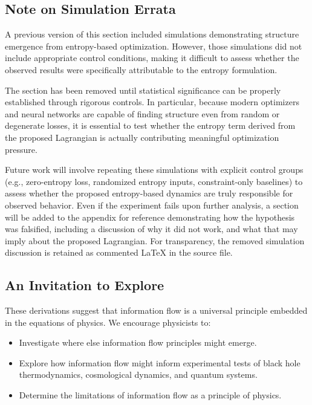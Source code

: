 \documentclass[12pt]{article}
\begin{document}
\subsection{Note on Simulation Errata}

A previous version of this section included simulations demonstrating structure emergence from entropy-based optimization. However, those simulations did not include appropriate control conditions, making it difficult to assess whether the observed results were specifically attributable to the entropy formulation.

The section has been removed until statistical significance can be properly established through rigorous controls. In particular, because modern optimizers and neural networks are capable of finding structure even from random or degenerate losses, it is essential to test whether the entropy term derived from the proposed Lagrangian is actually contributing meaningful optimization pressure.

Future work will involve repeating these simulations with explicit control groups (e.g., zero-entropy loss, randomized entropy inputs, constraint-only baselines) to assess whether the proposed entropy-based dynamics are truly responsible for observed behavior. Even if the experiment fails upon further analysis, a section will be added to the appendix for reference demonstrating how the hypothesis was falsified, including a discussion of why it did not work, and what that may imply about the proposed Lagrangian. For transparency, the removed simulation discussion is retained as commented LaTeX in the source file.


\subsection{An Invitation to Explore}

These derivations suggest that information flow is a universal principle embedded in the equations of physics. We encourage physicists to:
\begin{itemize}
    \item Investigate where else information flow principles might emerge.
    \item Explore how information flow might inform experimental tests of black hole thermodynamics, cosmological dynamics, and quantum systems.
    \item Determine the limitations of information flow as a principle of physics.
\end{itemize}
\end{document}
